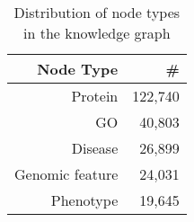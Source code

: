 \begin{table}
    \centering
    \begin{tabular}{rr}
        \toprule
        \textbf{Node Type} & \textbf{\#} \\
        \midrule
        Protein & 122,740 \\
        GO & 40,803 \\
        Disease & 26,899 \\
        Genomic feature & 24,031 \\
        Phenotype & 19,645 \\
        \bottomrule
    \end{tabular}
    \caption{Distribution of node types in the knowledge graph}
    
    \label{tab:nodetypes}
\end{table}